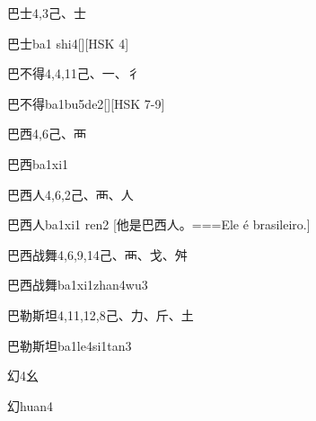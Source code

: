 \begin{Entry}{巴士}{4,3}{⼰、⼠}
  \begin{Phonetics}{巴士}{ba1 shi4}[][HSK 4]
  \end{Phonetics}
\end{Entry}

\begin{Entry}{巴不得}{4,4,11}{⼰、⼀、⼻}
  \begin{Phonetics}{巴不得}{ba1bu5de2}[][HSK 7-9]
  \end{Phonetics}
\end{Entry}

\begin{Entry}{巴西}{4,6}{⼰、⾑}
  \begin{Phonetics}{巴西}{ba1xi1}
  \end{Phonetics}
\end{Entry}

\begin{Entry}{巴西人}{4,6,2}{⼰、⾑、⼈}
  \begin{Phonetics}{巴西人}{ba1xi1 ren2}
    [他是巴西人。===Ele é brasileiro.]
  \end{Phonetics}
\end{Entry}

\begin{Entry}{巴西战舞}{4,6,9,14}{⼰、⾑、⼽、⾇}
  \begin{Phonetics}{巴西战舞}{ba1xi1zhan4wu3}
  \end{Phonetics}
\end{Entry}

\begin{Entry}{巴勒斯坦}{4,11,12,8}{⼰、⼒、⽄、⼟}
  \begin{Phonetics}{巴勒斯坦}{ba1le4si1tan3}
  \end{Phonetics}
\end{Entry}

\begin{Entry}{幻}{4}{⼳}
  \begin{Phonetics}{幻}{huan4}
  \end{Phonetics}
\end{Entry}

